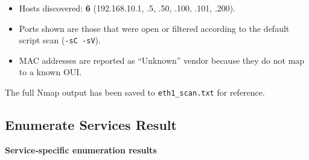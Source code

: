 \begin{itemize}
    \tightlist
    \item
    Hosts discovered: \textbf{6} (192.168.10.1, .5, .50, .100, .101,
    .200).
    \item
    Ports shown are those that were open or filtered according to the
    default script scan (\texttt{-sC\ -sV}).
    \item
    MAC addresses are reported as ``Unknown'' vendor because they do not
    map to a known OUI.
\end{itemize}

The full Nmap output has been saved to \texttt{eth1\_scan.txt} for
reference.

\subsection{Enumerate Services Result}\label{enumerate-services-result}

\textbf{Service‑specific enumeration results}

